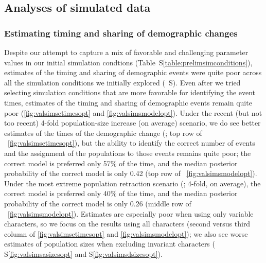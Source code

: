 \subsection{Analyses of simulated data}

\subsubsection{Estimating timing and sharing of demographic changes}

Despite our attempt to capture a mix of favorable and challenging parameter
values in our initial simulation condtions (Table~S\ref{table:prelimsimconditions}),
estimates of the timing and sharing of demographic events were quite poor
across all the simulation conditions we initially explored
(\figs{}~S).
Even after we tried selecting simulation conditions that are more favorable for
identifying the event times, estimates of the timing and
sharing of demographic events remain quite poor
(\figs \ref{fig:valsimsetimesopt} and \ref{fig:valsimsmodelopt}).
Under the recent (but not too recent) 4-fold population-size increase (on
average) scenario, we do see better estimates of the times of the demographic
change
(\vsimfourinc; top row of \fig{}~\ref{fig:valsimsetimesopt}),
but the ability to identify the correct number of events and the assignment of
the populations to those events remains quite poor;
the correct model is preferred only 57\% of the time, and the
median posterior probability of the correct model is only 0.42
(top row of \fig{}~\ref{fig:valsimsmodelopt}).
Under the most extreme population retraction scenario
(\vsimfourdec; 4-fold, on average),
the correct model is preferred only 40\% of the time, and the median
posterior probability of the correct model is only 0.26
(middle row of \fig{}~\ref{fig:valsimsmodelopt}).
Estimates are especially poor when using only variable characters,
so we focus on the results using all characters
(second versus third column of \figs
\ref{fig:valsimsetimesopt}
and
\ref{fig:valsimsmodelopt});
we also see worse estimates of population sizes when excluding invariant
characters
(\figs
S\ref{fig:valsimsasizesopt}
and
S\ref{fig:valsimsdsizesopt}).

\ifembed{

}{}

